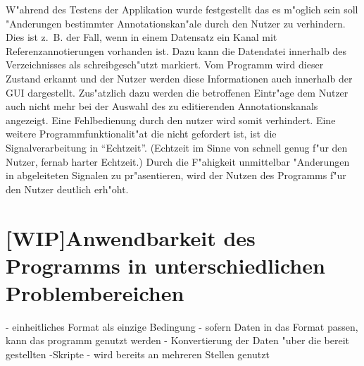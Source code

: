 W"ahrend des Testens der Applikation wurde festgestellt das es m"oglich sein soll "Anderungen bestimmter Annotationskan"ale durch den Nutzer zu verhindern.
Dies ist z.~B. der Fall, wenn in einem Datensatz ein Kanal mit Referenzannotierungen vorhanden ist.
Dazu kann die Datendatei innerhalb des Verzeichnisses als schreibgesch"utzt markiert.
Vom Programm wird dieser Zustand erkannt und der Nutzer werden diese Informationen auch innerhalb der \ac{GUI} dargestellt.
Zus"atzlich dazu werden die betroffenen Eintr"age dem Nutzer auch nicht mehr bei der Auswahl des zu editierenden Annotationskanals angezeigt.
Eine Fehlbedienung durch den nutzer wird somit verhindert.
Eine weitere Programmfunktionalit"at die nicht gefordert ist, ist die Signalverarbeitung in "`Echtzeit"'.
(Echtzeit im Sinne von schnell genug f"ur den Nutzer, fernab harter Echtzeit.)
Durch die F"ahigkeit unmittelbar "Anderungen in abgeleiteten Signalen zu pr"asentieren, wird der Nutzen des Programms f"ur den Nutzer deutlich erh"oht.


\section{[WIP]Anwendbarkeit des Programms in unterschiedlichen Problembereichen}

- einheitliches Format als einzige Bedingung
- sofern Daten in das Format passen, kann das programm genutzt werden
- Konvertierung der Daten "uber die bereit gestellten \mlNS-Skripte
- wird bereits an mehreren Stellen genutzt




